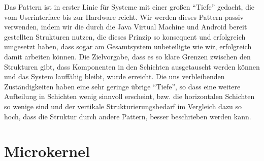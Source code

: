 \documentclass{scrreprt}
\begin{document}
Das Pattern ist in erster Linie für Systeme mit einer großen “Tiefe” gedacht, die vom Userinterface bis zur Hardware reicht. Wir werden dieses Pattern passiv verwenden, indem wir die durch die Java Virtual Machine und Android bereit gestellten Strukturen nutzen, die dieses Prinzip so konsequent und erfolgreich umgesetzt haben, dass sogar am Gesamtsystem unbeteiligte wie wir, erfolgreich damit arbeiten können. Die Zielvorgabe, dass es so klare Grenzen zwischen den Strukturen gibt, dass Komponenten in den Schichten ausgetauscht werden können und das System lauffähig bleibt, wurde erreicht.
Die uns verbleibenden Zuständigkeiten haben eine sehr geringe übrige “Tiefe”, so dass eine weitere Aufteilung in Schichten wenig sinnvoll erscheint, bzw. die horizontalen Schichten so wenige sind und der vertikale Strukturierungsbedarf im Vergleich dazu so hoch, dass die Struktur durch andere Pattern, besser beschrieben werden kann.

\chapter{Microkernel}
\end{document}
